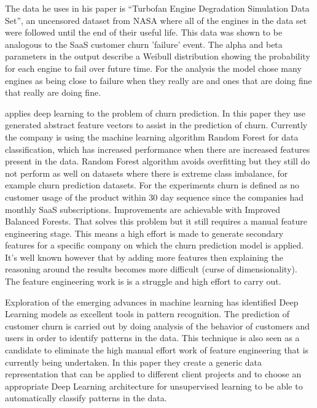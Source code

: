 \documentclass[final,a4paper,peerreviewca]{IEEEtran}
\begin{document}
The data he uses in his paper is “Turbofan Engine Degradation Simulation Data Set”, an uncensored dataset from NASA where all of the engines in the data set were followed until the end of their useful life. This data was shown to be analogous to the SaaS customer churn 'failure' event. The alpha and beta parameters in the output describe a Weibull distribution showing the probability for each engine to fail over future time. For the analysis the model chose many engines as being close to failure when they really are and ones that are doing fine that really are doing fine. 

\cite{Spanoudes:2017} applies deep learning to the problem of churn prediction. In this paper they use generated abstract feature vectors to assist in the prediction of churn. Currently the company is using the machine learning algorithm Random Forest for data classification, which has increased performance when there are increased features present in the data. Random Forest algorithm avoids overfitting but they still do not perform as well on datasets where there is extreme class imbalance, for example churn prediction datasets. For the experiments churn is defined as no customer usage of the product within 30 day sequence since the companies had monthly SaaS subscriptions. Improvements are achievable with Improved Balanced Forests. That solves this problem but it still requires a manual feature engineering stage. This means a high effort is made to generate secondary features for a specific company on which the churn prediction model is applied. It's well known however that by adding more features then explaining the reasoning around the results becomes more difficult (curse of dimensionality). The feature engineering work is is a struggle and high effort to carry out.

Exploration of the emerging advances in machine learning has identified Deep Learning models as excellent tools in pattern recognition. The prediction of customer churn is carried out by doing analysis of the behavior of customers and users in order to identify patterns in the data. This technique is also seen as a candidate to eliminate the high manual effort work of feature engineering that is currently being undertaken. In this paper they create a generic data representation that can be applied to different client projects and to choose an appropriate Deep Learning architecture for unsupervised learning to be able to automatically classify patterns in the data.
\end{document}
